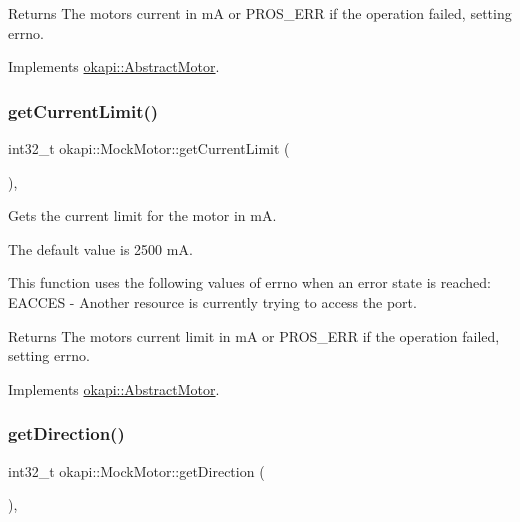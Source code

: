 \begin{DoxyReturn}{Returns}
The motor\textquotesingle{}s current in mA or P\+R\+O\+S\+\_\+\+E\+RR if the operation failed, setting errno. 
\end{DoxyReturn}


Implements \mbox{\hyperlink{classokapi_1_1AbstractMotor_a755ad2c78a4b36cc56eef1029a3aa217}{okapi\+::\+Abstract\+Motor}}.

\mbox{\label{classokapi_1_1MockMotor_a5535db4fba5f8c0ce5c20607f0586272}} 
\subsubsection{\texorpdfstring{getCurrentLimit()}{getCurrentLimit()}}
{\footnotesize\ttfamily int32\+\_\+t okapi\+::\+Mock\+Motor\+::get\+Current\+Limit (\begin{DoxyParamCaption}{ }\end{DoxyParamCaption})\hspace{0.3cm}{\ttfamily [override]}, {\ttfamily [virtual]}}



Gets the current limit for the motor in mA. 

The default value is 2500 mA.

This function uses the following values of errno when an error state is reached\+: E\+A\+C\+C\+ES -\/ Another resource is currently trying to access the port.

\begin{DoxyReturn}{Returns}
The motor\textquotesingle{}s current limit in mA or P\+R\+O\+S\+\_\+\+E\+RR if the operation failed, setting errno. 
\end{DoxyReturn}


Implements \mbox{\hyperlink{classokapi_1_1AbstractMotor_ab83ef3319ffe1cb1d020e5a10127aab8}{okapi\+::\+Abstract\+Motor}}.

\mbox{\label{classokapi_1_1MockMotor_a06859db144b150efe6d0156d7b69aa17}} 
\subsubsection{\texorpdfstring{getDirection()}{getDirection()}}
{\footnotesize\ttfamily int32\+\_\+t okapi\+::\+Mock\+Motor\+::get\+Direction (\begin{DoxyParamCaption}{ }\end{DoxyParamCaption})\hspace{0.3cm}{\ttfamily [override]}, {\ttfamily [virtual]}}




